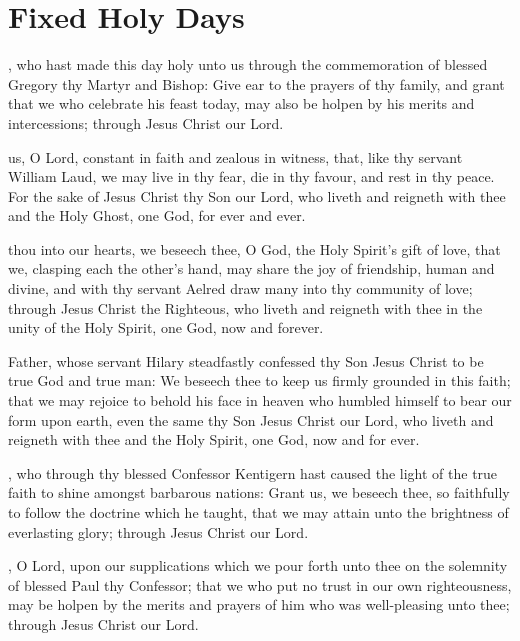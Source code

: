 \section{Fixed Holy Days}

, who hast made this day holy unto us through the commemoration of blessed Gregory thy Martyr and Bishop: Give ear to the prayers of thy family, and grant that we who celebrate his feast today, may also be holpen by his merits and intercessions; through Jesus Christ our Lord.

 us, O Lord, constant in faith and zealous in witness, that, like thy servant William Laud, we may live in thy fear, die in thy favour, and rest in thy peace. For the sake of Jesus Christ thy Son our Lord, who liveth and reigneth with thee and the Holy Ghost, one God, for ever and ever.

 thou into our hearts, we beseech thee, O God, the Holy Spirit's gift of love, that we, clasping each the other's hand, may share the joy of friendship, human and divine, and with thy servant Aelred draw many into thy community of love; through Jesus Christ the Righteous, who liveth and reigneth with thee in the unity of the Holy Spirit, one God, now and forever.

 Father, whose servant Hilary steadfastly confessed thy Son Jesus Christ to be true God and true man: We beseech thee to keep us firmly grounded in this faith; that we may rejoice to behold his face in heaven who humbled himself to bear our form upon earth, even the same thy Son Jesus Christ our Lord, who liveth and reigneth with thee and the Holy Spirit, one God, now and for ever.

, who through thy blessed Confessor Kentigern hast caused the light of the true faith to shine amongst barbarous nations: Grant us, we beseech thee, so faithfully to follow the doctrine which he taught, that we may attain unto the brightness of everlasting glory; through Jesus Christ our Lord.

, O Lord, upon our supplications which we pour forth unto thee on the solemnity of blessed Paul thy Confessor; that we who put no trust in our own righteousness, may be holpen by the merits and prayers of him who was well-pleasing unto thee; through Jesus Christ our Lord.

